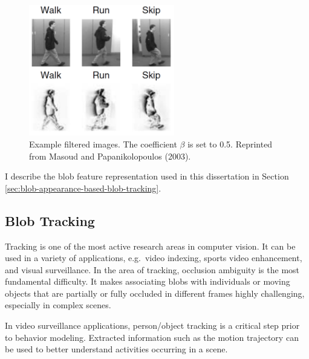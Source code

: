 \begin{figure}[t]
  \centering
  \includegraphics[width=2.5in]{figures/f-img}
  \caption[Example filtered images.]{\small Example filtered
    images. The coefficient $\beta$ is set to 0.5. Reprinted from
    Masoud and Papanikolopoulos (2003).}
  \label{fig:f-img}
\end{figure}

I describe the blob feature representation used in this dissertation
in Section \ref{sec:blob-appearance-based-blob-tracking}.

\subsection{Blob Tracking}

Tracking is one of the most active research areas in computer
vision. It can be used in a variety of applications, e.g.\ video
indexing, sports video enhancement, and visual surveillance.  In the
area of tracking, occlusion ambiguity is the most fundamental
difficulty.  It makes associating blobs with individuals or moving
objects that are partially or fully occluded in different frames
highly challenging, especially in complex scenes.

In video surveillance applications, person/object tracking is a
critical step prior to behavior modeling. Extracted information such
as the motion trajectory can be used to better understand activities
occurring in a scene.

